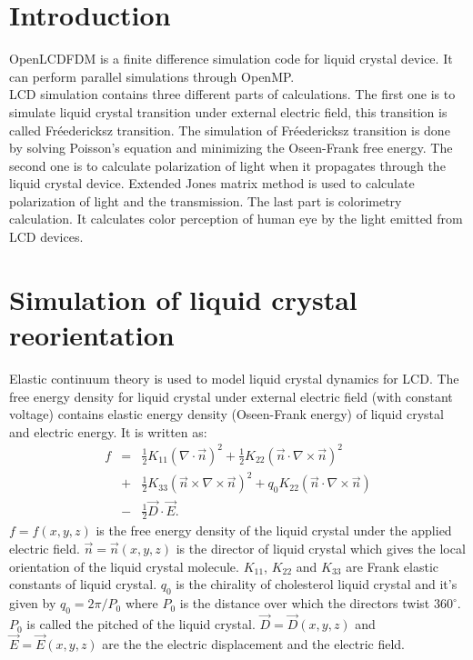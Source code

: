 \documentclass[11pt, a4paper]{article} %
\begin{document}
\begin{multicols}{2}
\section{Introduction}
OpenLCDFDM is a finite difference simulation code for liquid crystal device. It can perform parallel simulations through OpenMP. \\

LCD simulation contains three different parts of calculations. The first one is to simulate liquid crystal transition under external electric field, this transition is called Fréedericksz transition. The simulation of Fréedericksz transition is done by solving Poisson's equation and minimizing the Oseen-Frank free energy\cite{ShinTson}. The second one is to calculate polarization of light when it propagates through the liquid crystal device. Extended Jones matrix method is used to calculate polarization of light and the transmission\cite{POCHIYEH}. The last part is colorimetry calculation. It calculates color perception of human eye by the light emitted from LCD devices\cite{wiki_colorimetry}.\\

\section{Simulation of liquid crystal reorientation}
Elastic continuum theory is used to model liquid crystal dynamics for LCD. The free energy density for liquid crystal under external electric field (with constant voltage) contains elastic energy density (Oseen-Frank energy) of liquid crystal and electric energy. It is written as\cite{ShinTson}:
\begin{eqnarray}
f&=&\frac{1}{2}K_{11}(\nabla\cdot\vec{n})^2 + \frac{1}{2}K_{22}(\vec{n}\cdot\nabla\times\vec{n})^2 \nonumber \\
&+& \frac{1}{2}K_{33}(\vec{n}\times\nabla\times\vec{n})^2 + q_{0}K_{22}(\vec{n}\cdot\nabla\times\vec{n}) \nonumber \\
&-&\frac{1}{2}\vec{D}\cdot\vec{E}.
\label{eq:oseen_frank}
\end{eqnarray}
$f=f(x,y,z)$ is the free energy density of the liquid crystal under the applied electric field. $\vec{n}=\vec{n}(x,y,z)$ is the director of liquid crystal which gives the local orientation of the liquid crystal molecule. $K_{11}$, $K_{22}$ and $K_{33}$ are Frank elastic constants of liquid crystal. $q_0$ is the chirality of cholesterol liquid crystal and it's given by $q_0 = {2\pi}/{P_0}$ where $P_0$ is the distance over which the directors twist $360^{\circ}$. $P_0$ is called the pitched of the liquid crystal. $\vec{D}=\vec{D}(x,y,z)$ and $\vec{E}=\vec{E}(x,y,z)$ are the the electric displacement and the electric field.


\end{multicols}
\end{document}

